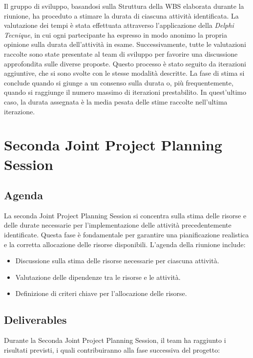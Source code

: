 Il gruppo di sviluppo, basandosi sulla Struttura della WBS elaborata durante la riunione, ha proceduto a stimare la durata di ciascuna attività identificata. La valutazione dei tempi è stata effettuata attraverso l'applicazione della \textit{Delphi Tecnique}, in cui ogni partecipante ha espresso in modo anonimo la propria opinione sulla durata dell'attività in esame. Successivamente, tutte le valutazioni raccolte sono state presentate al team di sviluppo per favorire una discussione approfondita sulle diverse proposte. Questo processo è stato seguito da iterazioni aggiuntive, che si sono svolte con le stesse modalità descritte. La fase di stima si conclude quando si giunge a un consenso sulla durata o, più frequentemente, quando si raggiunge il numero massimo di iterazioni prestabilito. In quest'ultimo caso, la durata assegnata è la media pesata delle stime raccolte nell'ultima iterazione.

\section{Seconda Joint Project Planning Session}

\subsection{Agenda}

La seconda Joint Project Planning Session si concentra sulla stima delle risorse e delle durate necessarie per l'implementazione delle attività precedentemente identificate. Questa fase è fondamentale per garantire una pianificazione realistica e la corretta allocazione delle risorse disponibili. L'agenda della riunione include:

\begin{itemize}
    \item Discussione sulla stima delle risorse necessarie per ciascuna attività.
    \item Valutazione delle dipendenze tra le risorse e le attività.
    \item Definizione di criteri chiave per l'allocazione delle risorse.
\end{itemize}

\subsection{Deliverables}

Durante la Seconda Joint Project Planning Session, il team ha raggiunto i risultati previsti, i quali contribuiranno alla fase successiva del progetto:

